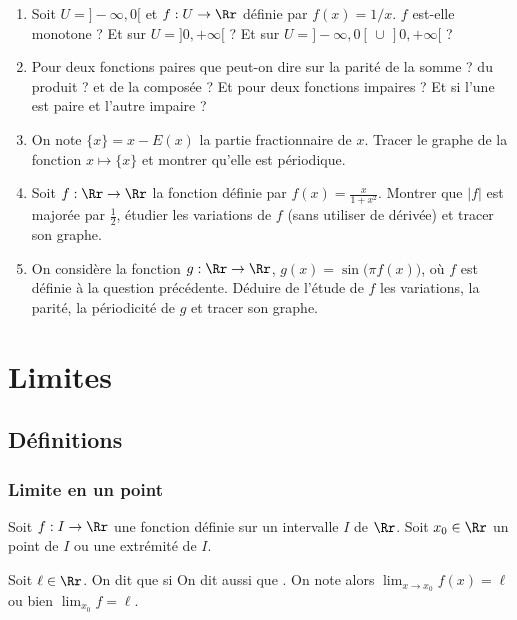 \documentclass[class=report,crop=false]{standalone}
\begin{document}
\begin{miniexercices}
\sauteligne
\begin{enumerate}
  \item Soit $U=]-\infty,0[$ et $f : U \to \Rr$ définie par $f(x)= 1/x$. $f$ est-elle  monotone ?
  Et sur $U=]0,+\infty[$ ? Et sur $U = ]-\infty,0[\,\cup \, ]0,+\infty[$ ?

  \item Pour deux fonctions paires que peut-on dire sur la parité de la somme ? du produit ? et de la
  composée ? Et pour deux fonctions impaires ? Et si l'une est paire et l'autre impaire ?

  \item On note $\{x\}=x-E(x)$ la partie fractionnaire de $x$.
  Tracer le graphe de la fonction $x\mapsto\{x\}$ et montrer qu'elle est périodique.

  \item Soit $f:\Rr\to\Rr$ la fonction définie par $f(x)=\frac{x}{1+x^2}$.
  Montrer que $|f|$ est majorée par $\frac12$, étudier les variations de $f$
  (sans utiliser de dérivée) et tracer son graphe.

  \item On considère la fonction $g:\Rr\to\Rr$, $g(x)=\sin\big(\pi f(x)\big)$,
  où $f$ est définie à la question précédente. Déduire de l'étude de $f$ les variations,
  la parité, la périodicité de $g$ et tracer son graphe.
\end{enumerate}
\end{miniexercices}


\section{Limites}
\subsection{Définitions}

\subsubsection{Limite en un point}

Soit $f:I\to\Rr$ une fonction définie sur un intervalle $I$ de $\Rr$.
Soit $x_0\in\Rr$ un point de $I$ ou une extrémité de $I$.

\begin{definition}
Soit $\ell\in\Rr$. On dit que  si
On dit aussi que .
On note alors $\displaystyle\lim_{x\to x_0}f(x)=\ell$ ou bien $\displaystyle\lim_{x_0} f=\ell$.
\end{definition}
\end{document}
